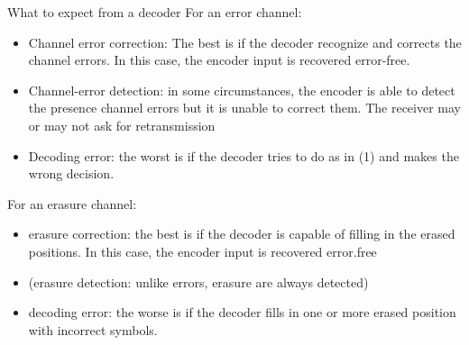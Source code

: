 \begin{parag}{What to expect from a decoder}
    For an error channel:
    \begin{itemize}
        \item Channel error correction: The best is if the decoder recognize and corrects the channel errors. In this case, the encoder input is recovered error-free.
        \item Channel-error detection: in some circumstances, the encoder is able to detect the presence channel errors but it is unable to correct them. The receiver may or may not ask for retransmission
        \item Decoding error: the worst is if the decoder tries to do as in (1) and makes the wrong decision.
    \end{itemize}
   For an erasure channel:
   \begin{itemize}
      \item erasure correction: the best is if the decoder is capable of filling in the erased positions. In this case, the encoder input is recovered error.free
      \item (erasure detection: unlike errors, erasure are always detected)
      \item decoding error: the worse is if the decoder fills in one or more erased position with incorrect symbols.
   \end{itemize}
   
\end{parag}
